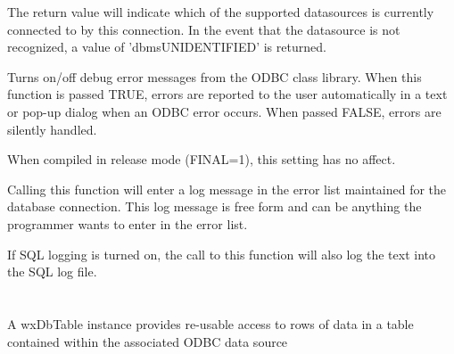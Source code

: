 
The return value will indicate which of the supported datasources is 
currently connected to by this connection.  In the event that the
datasource is not recognized, a value of 'dbmsUNIDENTIFIED' is returned.

\label{wxdbsetdebugerrormessages}




Turns on/off debug error messages from the ODBC class library.  When
this function is passed TRUE, errors are reported to the user automatically
in a text or pop-up dialog when an ODBC error occurs.  When passed FALSE,
errors are silently handled.

When compiled in release mode (FINAL=1), this setting has no affect.



\label{wxdblogerror}




Calling this function will enter a log message in the error list maintained
for the database connection.  This log message is free form and can be
anything the programmer wants to enter in the error list.

If SQL logging is turned on, the call to this function will also log the
text into the SQL log file.






\section{}\label{wxdbtable}

A wxDbTable instance provides re-usable access to rows of data in
a table contained within the associated ODBC data source

